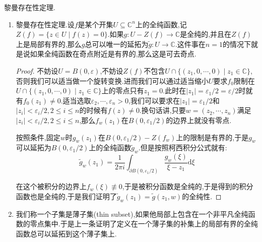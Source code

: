 黎曼存在性定理.
\begin{enumerate}
	\item 黎曼存在性定理.设$f$是某个开集$U\subseteq\mathbb{C}^n$上的全纯函数,记$Z(f)=\{z\in U\mid f(z)=0\}$.如果$g:U-Z(f)\to\mathbb{C}$是全纯的,并且在$Z(f)$上是局部有界的,那么$g$总可以唯一的延拓为$\widetilde{g}:U\to\mathbb{C}$.这件事在$n=1$的情况下就是说如果全纯函数在奇点附近是有界的,那么这是可去奇点.
	\begin{proof}
		
		不妨设$U=B(0,\varepsilon)$,不妨设$Z(f)$不包含$U\cap\{(z_1,0,\cdots,0)\mid z_1\in\mathbb{C}\}$,否则我们可以适当做一个旋转变换.进而我们可以通过适当缩小$U$要求$f_0$限制在$U\cap\{(z_1,0,\cdots,0)\mid z_1\in\mathbb{C}\}$上的零点只有$z_1=0$.此时在$|z_1|=\varepsilon_1/2=\varepsilon/2$时就有$f_0(z_1)\not=0$.适当选取$\varepsilon_2,\cdots,\varepsilon_n>0$,我们可以要求在$|z_1|=\varepsilon_1/2$和$|z_i|<\varepsilon_i/2,2\le i\le n$的时候有$f(z)\not=0$.换句话讲,只要$w=(z_2,\cdots,z_n)$满足$|z_i|<\varepsilon_i/2,2\le i\le n$,那么$f_w(z_1)$在$B(0,\varepsilon_1/2)$的边界上就没有零点.
		
		\qquad
		
		按照条件,固定$w$时$g_w(z_1)$在$B(0,\varepsilon_1/2)-Z(f_w)$上的限制是有界的,于是$g_w$可以延拓为$B(0,\varepsilon_1/2)$上的全纯函数$\widetilde{g}_w$.但是按照柯西积分公式就有:
		$$\widetilde{g}_w(z_1)=\frac{1}{2\pi i}\int_{\partial B(0,\varepsilon_1/2)}\frac{g_w(\xi)}{\xi-z_1}\mathrm{d}\xi$$
		
		在这个被积分的边界上$f_w(\xi)\not\equiv0$,于是被积分函数是全纯的,于是得到的积分函数也是全纯的,于是我们证明了$\widetilde{g}_w(z_1)=\widetilde{g}(z_1,w)$的全纯性.
	\end{proof}
    \item 我们称一个子集是薄子集(thin subset),如果他局部上包含在一个非平凡全纯函数的零点集中.于是上一条证明了定义在一个薄子集的补集上的局部有界的全纯函数总可以延拓到这个薄子集上.
\end{enumerate}


